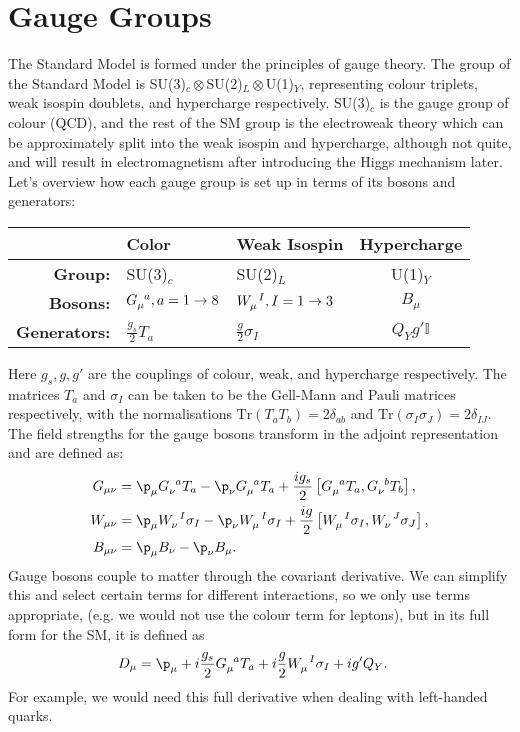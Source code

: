 \documentclass[a4paper, 11pt, normalem]{report}
\begin{document}
\section{Gauge Groups}
The Standard Model is formed under the principles of gauge theory.
The group of the Standard Model is SU(3)$_c\otimes$SU(2)$_L\otimes$U(1)$_Y$, representing colour triplets, weak isospin doublets, and hypercharge respectively.
SU(3)$_c$ is the gauge group of colour (QCD), and the rest of the SM group is the electroweak theory which can be approximately split into the weak isospin and hypercharge, although not quite, and will result in electromagnetism after introducing the Higgs mechanism later.
Let's overview how each gauge group is set up in terms of its bosons and generators:
\begin{table}[H]
    \centering
    \begin{tabular}{r|llc}
        \hline\hline
        & \textbf{Color} & \textbf{Weak Isospin} & \textbf{Hypercharge} \\
        \hline\hline
        \textbf{Group:} & SU(3)$_c$ & SU(2)$_L$ & U(1)$_Y$ \\
        \textbf{Bosons:} & $\tensor{G}{_\mu^a},a=1\to8$ & $\tensor{W}{_\mu^I},I=1\to3$ & $B_\mu$ \\
        \textbf{Generators:} & $\frac{g_s}{2}T_a$ & $\frac{g}{2}\sigma_I$ & $Q_Y g'\mathbb{I}$ \\
        \hline\hline
    \end{tabular}
\end{table}
Here $g_s,g,g'$ are the couplings of colour, weak, and hypercharge respectively.
The matrices $T_a$ and $\sigma_I$ can be taken to be the Gell-Mann and Pauli matrices respectively, with the normalisations $\text{Tr}(T_aT_b) = 2\delta_{ab}$ and $\text{Tr}(\sigma_I\sigma_J) = 2\delta_{IJ}$.
The field strengths for the gauge bosons transform in the adjoint representation and are defined as:
\begin{align}
    G_{\mu\nu} &= \p_\mu \tensor{G}{_\nu^a}T_a - \p_\nu\tensor{G}{_\mu^a}T_a + \frac{ig_s}{2}\left[\tensor{G}{_\mu^a}T_a,\tensor{G}{_\nu^b}T_b\right], \\
    W_{\mu\nu} &= \p_\mu \tensor{W}{_\nu^I}\sigma_I - \p_\nu\tensor{W}{_\mu^I}\sigma_I + \frac{ig}{2}\left[\tensor{W}{_\mu^I}\sigma_I,\tensor{W}{_\nu^J}\sigma_J\right],  \\
    B_{\mu\nu} &= \p_\mu B_\nu - \p_\nu B_\mu.
\end{align}
Gauge bosons couple to matter through the covariant derivative.
We can simplify this and select certain terms for different interactions, so we only use terms appropriate, (e.g. we would not use the colour term for leptons), but in its full form for the SM, it is defined as
\begin{align}
    D_\mu &= \p_\mu + i\frac{g_s}{2}\tensor{G}{_\mu^a}T_a + i\frac{g}{2}\tensor{W}{_\mu^I}\sigma_I + ig'Q_Y.
\end{align}
For example, we would need this full derivative when dealing with left-handed quarks.
\end{document}
